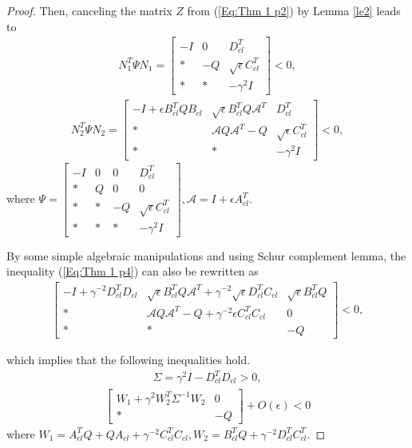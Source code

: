 \documentclass[journal,onecolumn]{IEEEtran}
\begin{document}
\begin{proof}
Then, canceling the matrix $Z$ from (\ref{Eq:Thm 1 p2}) by Lemma
\ref{le2} leads to
\begin{equation*}\begin{array}{l}
N_1^T\Psi N_1=\left[\begin{array}{cccc}- I&
0&D_{cl}^T\\{*}&-Q&\sqrt{\epsilon}C_{cl}^T\\{*}&{*}&-\gamma^2 I
\end{array}\right]<0,\end{array}
\end{equation*}
\begin{equation}\begin{array}{l} \label{Eq:Thm 1 p4}N_2^T\Psi
N_2=\left[\begin{array}{cccc}- I+\epsilon
B_{cl}^TQB_{cl}&\sqrt{\epsilon}B_{cl}^TQ\mathcal
{A}^T&D_{cl}^T\\{*}&\mathcal {A}Q\mathcal
{A}^T-Q&\sqrt{\epsilon}C_{cl}^T
\\{*}&{*}&-\gamma^2
I
\end{array}\right]<0,\end{array}
\end{equation}
where $\Psi=\left[\begin{array}{ccccc}-I&
0&0&D_{cl}^T\\{*}&Q&0&0\\{*}&{*}&-Q&\sqrt{\epsilon}C_{cl}^T\\{*}&{*}&{*}&-\gamma^2
I
\end{array}\right], \mathcal {A}=I+\epsilon A_{cl}^T.$

By some simple algebraic manipulations and using Schur complement
lemma, the  inequality (\ref{Eq:Thm 1 p4}) can also be rewritten as
\begin{equation}\begin{array}{l} \label{Eq:Thm 1 p5}\left[\begin{array}{cccc}- I+\gamma^{-2}D_{cl}^TD_{cl}
&\sqrt{\epsilon}B_{cl}^TQ\mathcal
{A}^T+\gamma^{-2}\sqrt{\epsilon}D_{cl}^TC_{cl}&\sqrt{\epsilon}B_{cl}^TQ\\{*}&\mathcal
{A}Q\mathcal {A}^T-Q+\gamma^{-2}\epsilon C_{cl}^TC_{cl}&0
\\{*}&{*}&-Q
\end{array}\right]<0,\end{array}
\end{equation}

which implies that the following inequalities hold.
\begin{equation*}\begin{array}{l}
\Sigma=\gamma^2 I-D_{cl}^TD_{cl}>0,\end{array}
\end{equation*}
\begin{equation*}\begin{array}{l}\left[\begin{array}{cc}W_1+\gamma^2W_2^T\Sigma^{-1}W_2&
0\\
* &
-Q\end{array}\right]+O(\epsilon)<0
\end{array}
\end{equation*}
where $W_1=A_{cl}^TQ+ QA_{cl}+\gamma^{-2}
C_{cl}^TC_{cl},W_2=B_{cl}^TQ+\gamma^{-2}D_{cl}^TC_{cl}^T$.


\end{proof}
\end{document}
